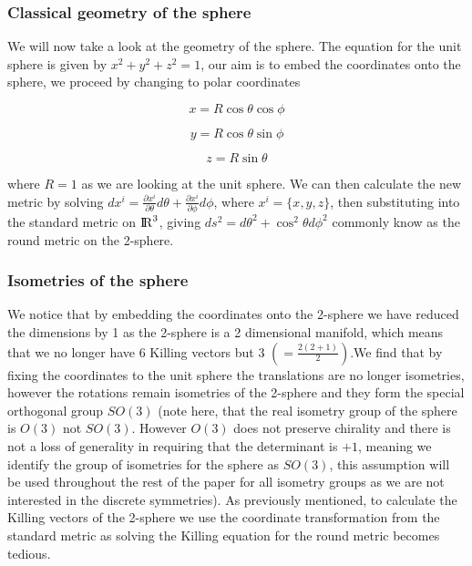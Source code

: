 \documentclass[a4paper,11pt]{article}
\numberwithin{equation}{section}
\numberwithin{figure}{section}
\begin{document}
\begin{large}
\newpage


\subsubsection{Classical geometry of the sphere}


We will now take a look at the geometry of the sphere. The equation for the unit sphere is given by $x^2+y^2+z^2=1$, our aim is to embed the coordinates onto the sphere, we proceed by changing to polar coordinates

\begin{equation}
\label{eq:xpol}
    x=R\cos\theta\cos\phi 
\end{equation}

\begin{equation}
\label{eq:ypol}
    y=R\cos\theta\sin\phi 
\end{equation}

\begin{equation}
\label{eq:zpol}
    z=R\sin\theta
\end{equation}


where $R=1$ as we are looking at the unit sphere. We can then calculate the new metric by solving $dx^i=\frac{\partial x^i}{\partial \theta}d\theta+\frac{\partial x^i}{\partial \phi}d\phi$, where $x^i=\{x,y,z\}$, then substituting into the standard metric on ${\rm I\!R}^3$, giving $ds^2=d\theta^2+\cos^2\theta d\phi^2$ commonly know as the round metric on the 2-sphere. 


\subsubsection{Isometries of the sphere}


We notice that by embedding the coordinates onto the 2-sphere we have reduced the dimensions by 1 as the 2-sphere is a 2 dimensional manifold, which means that we no longer have 6 Killing vectors but $3$ $(=\frac{2(2+1)}{2})$.We find that by fixing the coordinates to the unit sphere the translations are no longer isometries, however the rotations remain isometries of the 2-sphere and they form the special orthogonal group $SO(3)$ (note here, that the real isometry group of the sphere is $O(3)$ not $SO(3)$. However $O(3)$ does not preserve chirality and there is not a loss of generality in requiring that the determinant is $+1$, meaning we identify the group of isometries for the sphere as $SO(3)$, this assumption will be used throughout the rest of the paper for all isometry groups as we are not interested in the discrete symmetries). As previously mentioned, to calculate the Killing vectors of the 2-sphere we use the coordinate transformation from the standard metric as solving the Killing equation for the round metric becomes tedious. 


\end{large}
\end{document}
